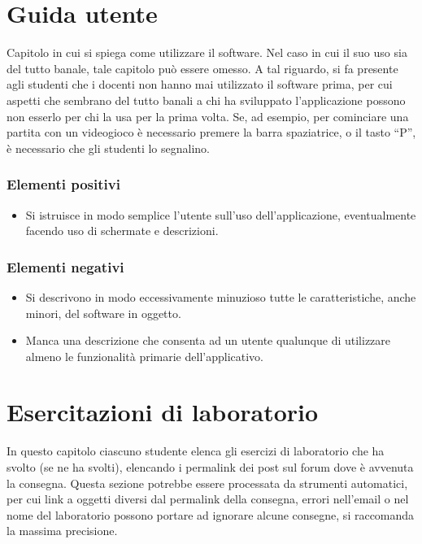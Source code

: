 \documentclass[a4paper,12pt]{report}
\begin{document}
\begin{itemize}
\appendix
\chapter{Guida utente}

Capitolo in cui si spiega come utilizzare il software. Nel caso in cui il suo uso sia del tutto
banale, tale capitolo può essere omesso.
%
A tal riguardo, si fa presente agli studenti che i docenti non hanno mai utilizzato il software
prima, per cui aspetti che sembrano del tutto banali a chi ha sviluppato l'applicazione possono non
esserlo per chi la usa per la prima volta.
%
Se, ad esempio, per cominciare una partita con un videogioco è necessario premere la barra
spaziatrice, o il tasto ``P'', è necessario che gli studenti lo segnalino.

\subsection*{Elementi positivi}

\begin{itemize}
 \item Si istruisce in modo semplice l'utente sull'uso dell'applicazione, eventualmente facendo uso di schermate e descrizioni.
\end{itemize}

\subsection*{Elementi negativi}
\begin{itemize}
 \item Si descrivono in modo eccessivamente minuzioso tutte le caratteristiche, anche minori, del software in oggetto.
 \item Manca una descrizione che consenta ad un utente qualunque di utilizzare almeno le funzionalità primarie dell'applicativo.
\end{itemize}

\chapter{Esercitazioni di laboratorio}

In questo capitolo ciascuno studente elenca gli esercizi di laboratorio che ha svolto
(se ne ha svolti),
elencando i permalink dei post sul forum dove è avvenuta la consegna.
%
Questa sezione potrebbe essere processata da strumenti automatici,
per cui link a oggetti diversi dal permalink della consegna,
errori nell'email o nel nome del laboratorio possono portare ad ignorare alcune consegne,
si raccomanda la massima precisione.


\end{itemize}
\end{document}
